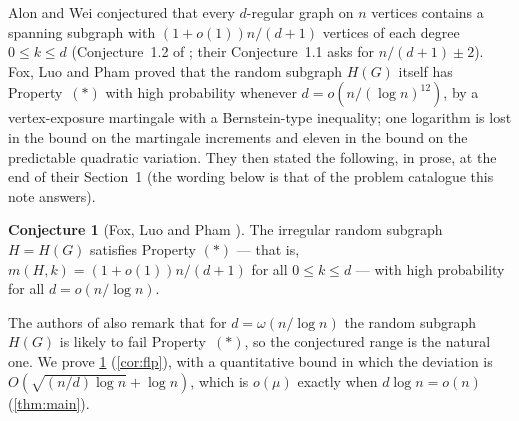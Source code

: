 \documentclass[11pt,a4paper]{article}
\theoremstyle{plain}
\theoremstyle{definition}
\newtheorem{conjecture}[theorem]{Conjecture}
\theoremstyle{remark}
\begin{document}
Alon and Wei \cite{AW23} conjectured that every $d$-regular graph on $n$ vertices contains a spanning subgraph with $(1+o(1))n/(d+1)$ vertices of each degree $0\le k\le d$ (Conjecture~1.2 of \cite{FLP24}; their Conjecture~1.1 asks for $n/(d+1)\pm2$). Fox, Luo and Pham \cite[Theorem~1.3]{FLP24} proved that the random subgraph $H(G)$ itself has Property~$(\ast)$ with high probability whenever $d=o(n/(\log n)^{12})$, by a vertex-exposure martingale with a Bernstein-type inequality; one logarithm is lost in the bound on the martingale increments and eleven in the bound on the predictable quadratic variation. They then stated the following, in prose, at the end of their Section~1 (the wording below is that of the problem catalogue this note answers).

\begin{conjecture}[{Fox, Luo and Pham \cite[Section~1]{FLP24}}]\label{conj:flp}
The irregular random subgraph $H = H(G)$ satisfies Property $(\ast)$ --- that is, $m(H,k) = (1+o(1))n/(d+1)$ for all $0 \le k \le d$ --- with high probability for all $d = o(n/\log n)$.
\end{conjecture}

The authors of \cite{FLP24} also remark that for $d=\omega(n/\log n)$ the random subgraph $H(G)$ is likely to fail Property~$(\ast)$, so the conjectured range is the natural one. We prove \cref{conj:flp} (\cref{cor:flp}), with a quantitative bound in which the deviation is $O(\sqrt{(n/d)\log n}+\log n)$, which is $o(\mu)$ exactly when $d\log n=o(n)$ (\cref{thm:main}).
\end{document}
